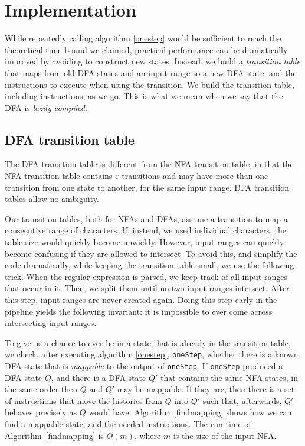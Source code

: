 \documentclass[english]{sigplanconf}
\theoremstyle{definition}
\begin{document}
\section{Implementation}
While repeatedly calling algorithm \ref{onestep} would be sufficient
to reach the theoretical time bound we claimed, practical performance
can be dramatically improved by avoiding to construct new states.
Instead, we build a \emph{transition table} that maps from old DFA
states and an input range to a new DFA state, and the instructions
to execute when using the transition. We build the transition table,
including instructions, as we go. This is what we mean when we say
that the DFA is \emph{lazily compiled}. 

\subsection{DFA transition table}
The DFA transition table is different from the NFA transition table,
in that the NFA transition table contains $\varepsilon$ transitions and
may have more than one transition from one state to another, for
the same input range. DFA transition tables allow no ambiguity.

Our transition tables, both for NFAs and DFAs, assume a transition
to map a consecutive range of characters. If, instead, we used
individual characters, the table size would quickly become unwieldy.
However, input ranges can quickly become confusing if they are
allowed to intersect. To avoid this, and simplify the code dramatically,
while keeping the transition table small, we use the following
trick. When the regular expression is parsed, we keep track of all
input ranges that occur in it. Then, we split them until no two
input ranges intersect.  After this step, input ranges are never
created again.  Doing this step early in the pipeline yields the
following invariant: it is impossible to ever come across intersecting
input ranges.

To give us a chance to ever be in a state that is already in the
transition table, we check, after executing algorithm \ref{onestep},
\texttt{oneStep}, whether there is a known DFA state that is
\emph{mappable} to the output of \texttt{oneStep}.  If \texttt{oneStep}
produced a DFA state $Q$, and there is a DFA state $Q'$ that contains
the same NFA states, in the same order then $Q$ and $Q'$ may be
mappable.  If they are, then there is a set of instructions that
move the histories from $Q$ into $Q'$ such that, afterwards, $Q'$
behaves precisely as $Q$ would have. Algorithm \ref{findmapping}
shows how we can find a mappable state, and the needed instructions.
The run time of Algorithm~\ref{findmapping} is $O(m)$, where $m$
is the size of the input NFA.
\end{document}
